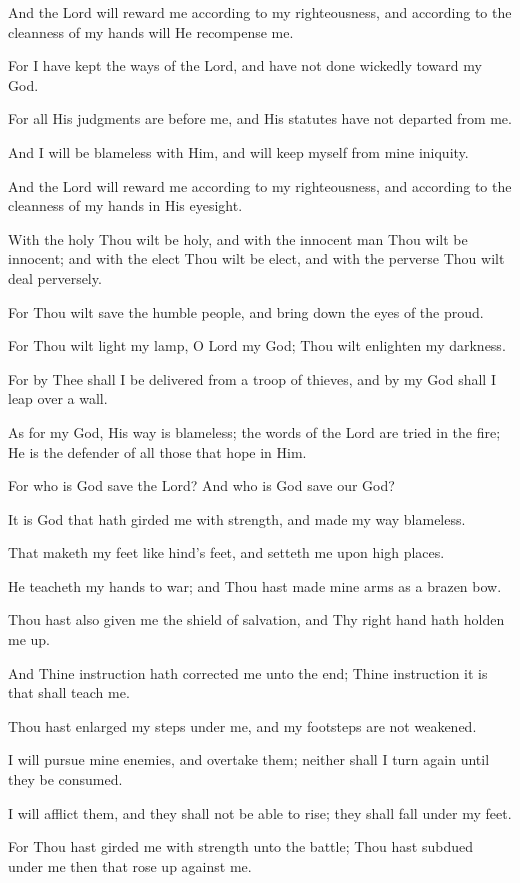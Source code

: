 And the Lord will reward me according to my righteousness, and according to the cleanness of my hands will He recompense me.

For I have kept the ways of the Lord, and have not done wickedly toward my God.

For all His judgments are before me, and His statutes have not departed from me.

And I will be blameless with Him, and will keep myself from mine iniquity.

And the Lord will reward me according to my righteousness, and according to the cleanness of my hands in His eyesight.

With the holy Thou wilt be holy, and with the innocent man Thou wilt be innocent; and with the elect Thou wilt be elect, and with the perverse Thou wilt deal perversely.

For Thou wilt save the humble people, and bring down the eyes of the proud.

For Thou wilt light my lamp, O Lord my God; Thou wilt enlighten my darkness.

For by Thee shall I be delivered from a troop of thieves, and by my God shall I leap over a wall.

As for my God, His way is blameless; the words of the Lord are tried in the fire; He is the defender of all those that hope in Him.

For who is God save the Lord? And who is God save our God?

It is God that hath girded me with strength, and made my way blameless.

That maketh my feet like hind’s feet, and setteth me upon high places.

He teacheth my hands to war; and Thou hast made mine arms as a brazen bow.

Thou hast also given me the shield of salvation, and Thy right hand hath holden me up.

And Thine instruction hath corrected me unto the end; Thine instruction it is that shall teach me.

Thou hast enlarged my steps under me, and my footsteps are not weakened.

I will pursue mine enemies, and overtake them; neither shall I turn again until they be consumed.

I will afflict them, and they shall not be able to rise; they shall fall under my feet.

For Thou hast girded me with strength unto the battle; Thou hast subdued under me then that rose up against me.

